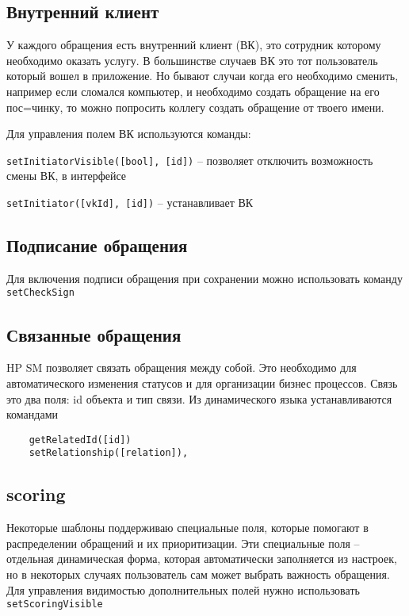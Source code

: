 \documentclass[../index.tex]{subfiles}
\begin{document}
\subsection{Внутренний клиент}

У каждого обращения есть внутренний клиент (ВК), это сотрудник которому необходимо оказать услугу. В большинстве случаев 
ВК это тот пользователь который вошел в приложение. Но бывают случаи когда его необходимо сменить, например если сломался компьютер,
и необходимо создать обращение на его пос=чинку, то можно попросить коллегу создать обращение от твоего имени.

Для управления полем ВК используются команды:

\verb|setInitiatorVisible([bool], [id])| -- позволяет отключить возможность смены ВК, в интерфейсе


\verb|setInitiator([vkId], [id])| -- устанавливает ВК

\subsection{Подписание обращения}
Для включения подписи обращения при сохранении можно использовать команду \verb|setCheckSign|


\subsection{Связанные обращения}
HP SM позволяет связать обращения между собой. Это необходимо для автоматического изменения статусов и для
организации бизнес процессов. Связь это два поля: id объекта и тип связи. Из динамического языка устанавливаются командами
\begin{verbatim}
	getRelatedId([id])
	setRelationship([relation]),
\end{verbatim} 

\subsection{scoring}
Некоторые шаблоны поддерживаю специальные поля, которые помогают в распределении обращений и их приоритизации.
Эти специальные поля -- отдельная динамическая форма, которая автоматически заполняется из настроек, но в некоторых
случаях пользователь сам может выбрать важность обращения. Для управления видимостью дополнительных полей нужно использовать
\verb|setScoringVisible|
\end{document}
